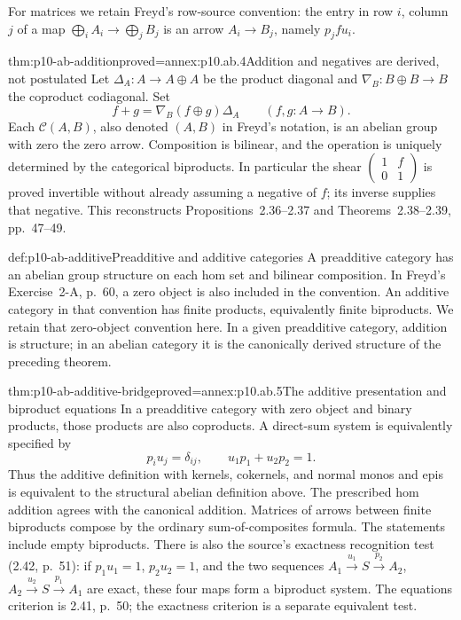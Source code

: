 For matrices we retain Freyd's row-source convention: the entry in row
\(i\), column \(j\) of a map \(\bigoplus_i A_i\to\bigoplus_j B_j\)
is an arrow \(A_i\to B_j\), namely \(p_jfu_i\).

\begin{hbtheorem}{thm:p10-ab-addition}{proved=annex:p10.ab.4}{Addition and negatives are derived, not postulated}
Let \(\Delta_A:A\to A\oplus A\) be the product diagonal and
\(\nabla_B:B\oplus B\to B\) the coproduct codiagonal. Set
\[
 f+g=\nabla_B(f\oplus g)\Delta_A\qquad(f,g:A\to B).
\]
Each \(\mathcal C(A,B)\), also denoted \((A,B)\) in Freyd's
notation, is an abelian group with zero the zero arrow. Composition
is bilinear, and the operation is uniquely determined by the categorical
biproducts. In particular the shear
\(\left(\begin{smallmatrix}1&f\\0&1\end{smallmatrix}\right)\)
is proved invertible without already assuming a negative of \(f\);
its inverse supplies that negative. This reconstructs
Propositions~2.36--2.37 and Theorems~2.38--2.39, pp.~47--49.
\end{hbtheorem}

\begin{hbdefinition}{def:p10-ab-additive}{Preadditive and additive categories}
A preadditive category has an abelian group structure on each hom set
and bilinear composition. In Freyd's Exercise~2-A, p.~60, a zero object
is also included in the convention. An additive category in that
convention has finite products, equivalently finite biproducts.
We retain that zero-object convention here. In a given preadditive
category, addition is structure; in an abelian category it is the
canonically derived structure of the preceding theorem.
\end{hbdefinition}

\begin{hbtheorem}{thm:p10-ab-additive-bridge}{proved=annex:p10.ab.5}{The additive presentation and biproduct equations}
In a preadditive category with zero object and binary products, those
products are also coproducts. A direct-sum system is equivalently
specified by
\[
 p_i u_j=\delta_{ij},\qquad u_1p_1+u_2p_2=1.
\]
Thus the additive definition with kernels, cokernels, and normal monos
and epis is equivalent to the structural abelian definition above.
The prescribed hom addition agrees with the canonical addition.
Matrices of arrows between finite biproducts compose by the ordinary
sum-of-composites formula. The statements include empty biproducts.
There is also the source's exactness recognition test (2.42, p.~51):
if \(p_1u_1=1\), \(p_2u_2=1\), and the two sequences
\(A_1\xrightarrow{u_1}S\xrightarrow{p_2}A_2\),
\(A_2\xrightarrow{u_2}S\xrightarrow{p_1}A_1\) are exact,
these four maps form a biproduct system. The equations criterion is
2.41, p.~50; the exactness criterion is a separate equivalent test.
\end{hbtheorem}

